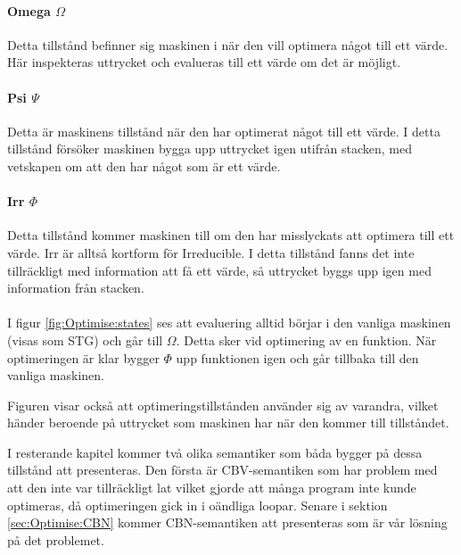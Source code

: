 \documentclass[Rapport]{subfiles}
\begin{document}
\paragraph{Omega $\Omega$} Detta tillstånd befinner sig maskinen i när den vill optimera något till ett värde. Här
inspekteras uttrycket och evalueras till ett värde om det är möjligt.

\paragraph{Psi $\Psi$} Detta är maskinens tillstånd när den har optimerat något till ett värde. I detta tillstånd
försöker maskinen bygga upp uttrycket igen utifrån stacken, med vetskapen om att den har
något som är ett värde.

\paragraph{Irr $\Phi$} Detta tillstånd kommer maskinen till om den har misslyckats att optimera till ett värde. Irr är alltså kortform för Irreducible.
I detta tillstånd fanns det inte tillräckligt med information att få ett
värde, så uttrycket byggs upp igen med information från stacken.

\paragraph{}
I figur \ref{fig:Optimise:states} ses att evaluering alltid börjar i den vanliga maskinen
 (visas som STG) och går till $\Omega$. Detta sker vid optimering av en funktion.
När optimeringen är klar bygger $\Phi$ upp funktionen igen och går tillbaka till den vanliga maskinen.

\stgOptimise

Figuren visar också att optimeringstillstånden använder sig av varandra, vilket
händer beroende på uttrycket som maskinen har när den kommer till tillståndet.

I resterande kapitel kommer två olika semantiker som båda bygger på dessa tillstånd
att presenteras. Den första är CBV-semantiken som har
problem med att den inte var tillräckligt lat vilket gjorde att många program inte 
kunde optimeras, då optimeringen gick in i oändliga loopar. Senare i sektion \ref{sec:Optimise:CBN} 
kommer CBN-semantiken att presenteras som är vår lösning på det problemet.













%
%
%
\end{document}
